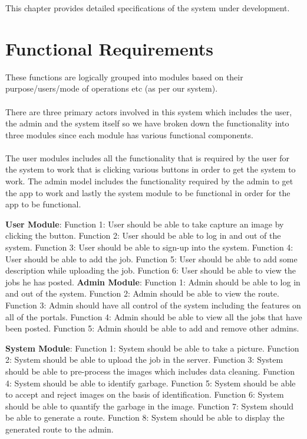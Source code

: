 This chapter provides detailed specifications of the system under development.

\section{Functional Requirements}
These functions are logically grouped into modules based on their purpose/users/mode of operations etc (as per our system). \\
\\
There are three primary actors involved in this system which includes the user, the admin and the system itself so we have broken down the functionality into three modules since each module has various functional components. \\
\\
The user modules includes all the functionality that is required by the user for the system to work that is clicking various buttons in order to get the system to work. The admin model includes the functionality required by the admin to get the app to work and lastly the system module to be functional in order for the app to be functional.  
\begin{outline}
  \1 \textbf{User Module}:
  \2 Function 1: User should be able to take capture an image by clicking the button.
  \2 Function 2: User should be able to log in and out of the system.
  \2 Function 3: User should be able to sign-up into the system.
  \2 Function 4: User should be able to add the job.
  \2 Function 5: User should be able to add some description while uploading the job.
  \2 Function 6: User should be able to view the jobs he has posted.
  \1 \textbf{Admin Module}:
  \2 Function 1: Admin should be able to log in and out of the system.
  \2 Function 2: Admin should be able to view the route.
  \2 Function 3: Admin should have all control of the system including the features on all of the portals.
  \2 Function 4: Admin should be able to view all the jobs that have been posted.
  \2 Function 5: Admin should be able to add and remove other admins.
  
  \1 \textbf{System Module}:
  \2 Function 1: System should be able to take a picture.
  \2 Function 2: System should be able to upload the job in the server.
  \2 Function 3: System should be able to pre-process the images which includes data cleaning.
  \2 Function 4: System should be able to identify garbage.
  \2 Function 5: System should be able to accept and reject images on the basis of identification.
  \2 Function 6: System should be able to quantify the garbage in the image.
  \2 Function 7: System should be able to generate a route.
  \2 Function 8: System should be able to display the generated route to the admin.
\end{outline}


